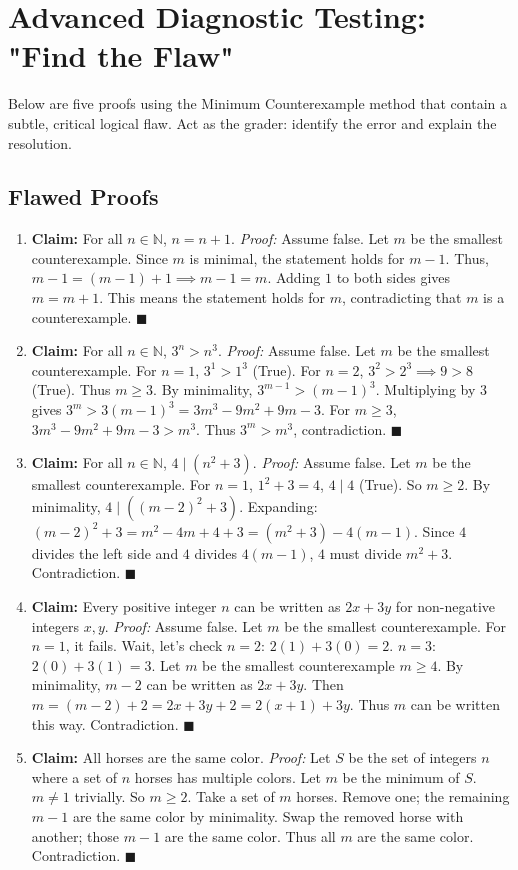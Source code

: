 \documentclass[11pt, a4paper]{article}
\theoremstyle{definition}
\theoremstyle{remark}
\newcommand{\N}{\mathbb{N}}
\begin{document}
\section{Advanced Diagnostic Testing: "Find the Flaw"}

Below are five proofs using the Minimum Counterexample method that contain a subtle, critical logical flaw. Act as the grader: identify the error and explain the resolution.

\subsection{Flawed Proofs}
\begin{enumerate}
    \item \textbf{Claim:} For all $n \in \N$, $n = n+1$.
    \textit{Proof:} Assume false. Let $m$ be the smallest counterexample. Since $m$ is minimal, the statement holds for $m-1$. Thus, $m-1 = (m-1) + 1 \implies m-1 = m$. Adding $1$ to both sides gives $m = m+1$. This means the statement holds for $m$, contradicting that $m$ is a counterexample. $\blacksquare$
    
    \item \textbf{Claim:} For all $n \in \N$, $3^n > n^3$.
    \textit{Proof:} Assume false. Let $m$ be the smallest counterexample. For $n=1$, $3^1 > 1^3$ (True). For $n=2$, $3^2 > 2^3 \implies 9 > 8$ (True). Thus $m \ge 3$. By minimality, $3^{m-1} > (m-1)^3$. Multiplying by 3 gives $3^m > 3(m-1)^3 = 3m^3 - 9m^2 + 9m - 3$. For $m \ge 3$, $3m^3 - 9m^2 + 9m - 3 > m^3$. Thus $3^m > m^3$, contradiction. $\blacksquare$
    
    \item \textbf{Claim:} For all $n \in \N$, $4 \mid (n^2 + 3)$.
    \textit{Proof:} Assume false. Let $m$ be the smallest counterexample. For $n=1$, $1^2+3=4$, $4 \mid 4$ (True). So $m \ge 2$. By minimality, $4 \mid ((m-2)^2 + 3)$. Expanding: $(m-2)^2 + 3 = m^2 - 4m + 4 + 3 = (m^2 + 3) - 4(m - 1)$. Since $4$ divides the left side and $4$ divides $4(m-1)$, $4$ must divide $m^2 + 3$. Contradiction. $\blacksquare$
    
    \item \textbf{Claim:} Every positive integer $n$ can be written as $2x + 3y$ for non-negative integers $x, y$.
    \textit{Proof:} Assume false. Let $m$ be the smallest counterexample. For $n=1$, it fails. Wait, let's check $n=2$: $2(1)+3(0)=2$. $n=3$: $2(0)+3(1)=3$. Let $m$ be the smallest counterexample $m \ge 4$. By minimality, $m-2$ can be written as $2x+3y$. Then $m = (m-2)+2 = 2x+3y+2 = 2(x+1)+3y$. Thus $m$ can be written this way. Contradiction. $\blacksquare$
    
    \item \textbf{Claim:} All horses are the same color.
    \textit{Proof:} Let $S$ be the set of integers $n$ where a set of $n$ horses has multiple colors. Let $m$ be the minimum of $S$. $m \neq 1$ trivially. So $m \ge 2$. Take a set of $m$ horses. Remove one; the remaining $m-1$ are the same color by minimality. Swap the removed horse with another; those $m-1$ are the same color. Thus all $m$ are the same color. Contradiction. $\blacksquare$
\end{enumerate}
\end{document}
